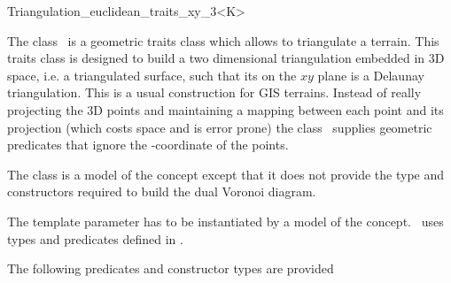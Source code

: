 

\begin{ccRefClass}{Triangulation_euclidean_traits_xy_3<K>}  %

\ccDefinition
  
The class \ccRefName\ is a geometric traits class which allows to
triangulate
a terrain. This traits class is designed to build 
a two dimensional triangulation  embedded in 3D space,
i.e. a triangulated surface, such that 
its
on the $xy$ plane  is a Delaunay triangulation.
This is a usual construction for GIS terrains.
Instead of really projecting the 3D points and
maintaining a mapping between each point and its projection
 (which costs space and is error prone)
the class \ccRefName\  supplies geometric predicates that ignore the
-coordinate of the points.

The class is a model of the concept  
except that it does not provide the type and constructors
required to build the dual Voronoi diagram.

\ccParameters
The template parameter   has to
be instantiated by a model of the  concept.
\ccRefName\ uses types 
and predicates defined in .


\ccTypes
{}
\ccGlue
{}
\ccGlue
{}

The following predicates and constructor types are provided


\end{ccRefClass}
